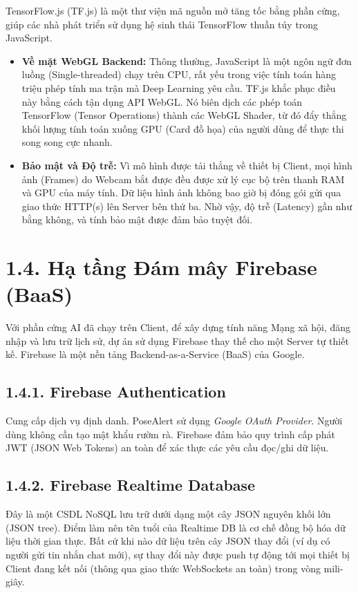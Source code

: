 \documentclass[12pt,a4paper]{report}
\begin{document}
TensorFlow.js (TF.js) là một thư viện mã nguồn mở tăng tốc bằng phần cứng, giúp các nhà phát triển sử dụng hệ sinh thái TensorFlow thuần túy trong JavaScript.
\begin{itemize}
    \item \textbf{Về mặt WebGL Backend:} Thông thường, JavaScript là một ngôn ngữ đơn luồng (Single-threaded) chạy trên CPU, rất yếu trong việc tính toán hàng triệu phép tính ma trận mà Deep Learning yêu cầu. TF.js khắc phục điều này bằng cách tận dụng API WebGL. Nó biên dịch các phép toán TensorFlow (Tensor Operations) thành các WebGL Shader, từ đó đẩy thẳng khối lượng tính toán xuống GPU (Card đồ họa) của người dùng để thực thi song song cực nhanh.
    \item \textbf{Bảo mật và Độ trễ:} Vì mô hình được tải thẳng về thiết bị Client, mọi hình ảnh (Frames) do Webcam bắt được đều được xử lý cục bộ trên thanh RAM và GPU của máy tính. Dữ liệu hình ảnh không bao giờ bị đóng gói gửi qua giao thức HTTP(s) lên Server bên thứ ba. Nhờ vậy, độ trễ (Latency) gần như bằng không, và tính bảo mật được đảm bảo tuyệt đối.
\end{itemize}

\section{1.4. Hạ tầng Đám mây Firebase (BaaS)}
Với phần cứng AI đã chạy trên Client, để xây dựng tính năng Mạng xã hội, đăng nhập và lưu trữ lịch sử, dự án sử dụng Firebase thay thế cho một Server tự thiết kế. Firebase là một nền tảng Backend-as-a-Service (BaaS) của Google.

\subsection{1.4.1. Firebase Authentication}
Cung cấp dịch vụ định danh. PoseAlert sử dụng \textit{Google OAuth Provider}. Người dùng không cần tạo mật khẩu rườm rà. Firebase đảm bảo quy trình cấp phát JWT (JSON Web Tokens) an toàn để xác thực các yêu cầu đọc/ghi dữ liệu.

\subsection{1.4.2. Firebase Realtime Database}
Đây là một CSDL NoSQL lưu trữ dưới dạng một cây JSON nguyên khối lớn (JSON tree). Điểm làm nên tên tuổi của Realtime DB là cơ chế đồng bộ hóa dữ liệu thời gian thực. Bất cứ khi nào dữ liệu trên cây JSON thay đổi (ví dụ có người gửi tin nhắn chat mới), sự thay đổi này được push tự động tới mọi thiết bị Client đang kết nối (thông qua giao thức WebSockets an toàn) trong vòng mili-giây.
\end{document}
